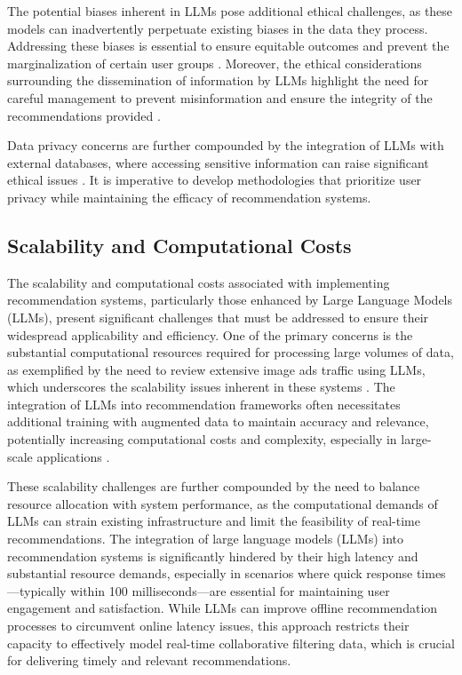The potential biases inherent in LLMs pose additional ethical challenges, as these models can inadvertently perpetuate existing biases in the data they process. Addressing these biases is essential to ensure equitable outcomes and prevent the marginalization of certain user groups . Moreover, the ethical considerations surrounding the dissemination of information by LLMs highlight the need for careful management to prevent misinformation and ensure the integrity of the recommendations provided \cite{jiao2024navigatingllmethicsadvancements}.



Data privacy concerns are further compounded by the integration of LLMs with external databases, where accessing sensitive information can raise significant ethical issues \cite{qin2024relationaldatabaseaugmentedlarge}. It is imperative to develop methodologies that prioritize user privacy while maintaining the efficacy of recommendation systems.





\subsection{Scalability and Computational Costs} \label{subsec:Scalability and Computational Costs}



The scalability and computational costs associated with implementing recommendation systems, particularly those enhanced by Large Language Models (LLMs), present significant challenges that must be addressed to ensure their widespread applicability and efficiency. One of the primary concerns is the substantial computational resources required for processing large volumes of data, as exemplified by the need to review extensive image ads traffic using LLMs, which underscores the scalability issues inherent in these systems \cite{qiao2024scalingllmreviewsgoogle}. The integration of LLMs into recommendation frameworks often necessitates additional training with augmented data to maintain accuracy and relevance, potentially increasing computational costs and complexity, especially in large-scale applications \cite{luo2024integrating}.



These scalability challenges are further compounded by the need to balance resource allocation with system performance, as the computational demands of LLMs can strain existing infrastructure and limit the feasibility of real-time recommendations. The integration of large language models (LLMs) into recommendation systems is significantly hindered by their high latency and substantial resource demands, especially in scenarios where quick response times—typically within 100 milliseconds—are essential for maintaining user engagement and satisfaction. While LLMs can improve offline recommendation processes to circumvent online latency issues, this approach restricts their capacity to effectively model real-time collaborative filtering data, which is crucial for delivering timely and relevant recommendations. \cite{xu2024prompting,xi2024towards}



